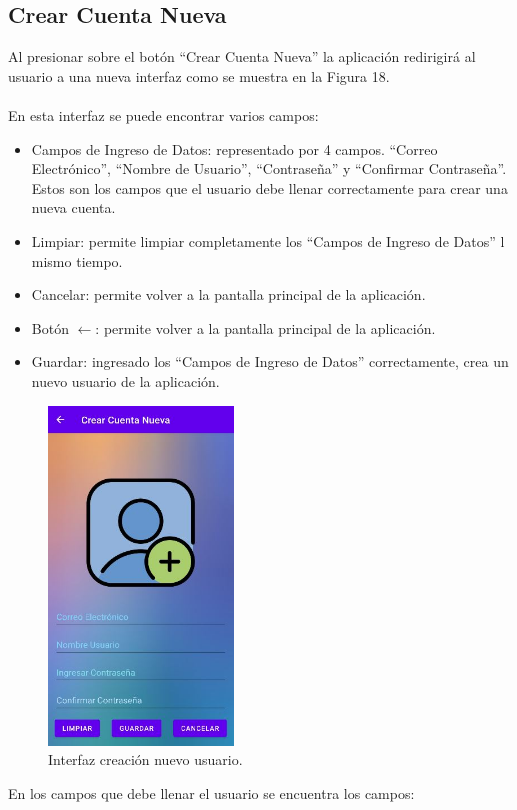 \documentclass[a4paper,10pt, oneside, titlepage]{article}
\begin{document}
	\subsection{Crear Cuenta Nueva}
	Al presionar sobre el botón ``Crear Cuenta Nueva'' la aplicación redirigirá al usuario a una nueva interfaz como se muestra en la Figura 18.\\\\
	En esta interfaz se puede encontrar varios campos:
	\begin{itemize}
		\item Campos de Ingreso de Datos: representado por 4 campos. ``Correo Electrónico'', ``Nombre de Usuario'', ``Contraseña'' y ``Confirmar Contraseña''. Estos son los campos que el usuario debe llenar correctamente para crear una nueva cuenta.
		\item Limpiar: permite limpiar completamente los ``Campos de Ingreso de Datos'' l mismo tiempo.
		\item Cancelar: permite volver a la pantalla principal de la aplicación.
		\item Botón $\leftarrow$: permite volver a la pantalla principal de la aplicación. 
		\item Guardar: ingresado los ``Campos de Ingreso de Datos'' correctamente, crea un nuevo usuario de la aplicación.
	\end{itemize}
	\begin{figure}[!h]
		\centering
		\includegraphics[width = 0.45\linewidth, height = 9cm]{18.jpg}
		\caption{Interfaz creación nuevo usuario.}
	\end{figure}
	En los campos que debe llenar el usuario se encuentra los campos:
\end{document}
